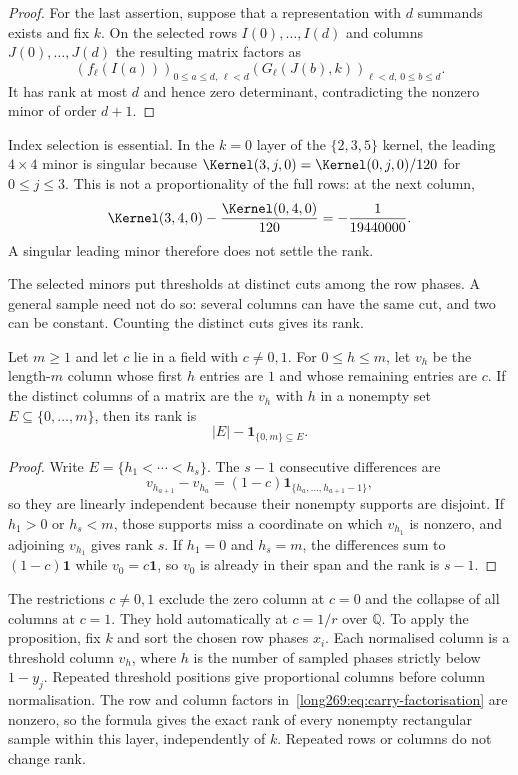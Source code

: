 \begin{proof}
For the last assertion, suppose that a representation with $d$ summands
exists and fix $k$.  On the selected rows $I(0),\ldots,I(d)$ and columns
$J(0),\ldots,J(d)$ the resulting matrix factors as
\[
 (f_\ell(I(a)))_{0\le a\le d,\,\ell<d}
 (G_\ell(J(b),k))_{\ell<d,\,0\le b\le d}.
\]
It has rank at most $d$ and hence zero determinant, contradicting the
nonzero minor of order $d+1$.
\end{proof}


Index selection is essential.  In the $k=0$ layer of the $\{2,3,5\}$
kernel, the leading $4\times4$ minor is singular because
$\Kernel(3,j,0)=\Kernel(0,j,0)/120$ for $0\le j\le3$.
This is not a proportionality of the full rows: at the next column,
\[
 \Kernel(3,4,0)-\frac{\Kernel(0,4,0)}{120}=-\frac1{19440000}.
\]
A singular leading minor therefore does not settle the rank.

The selected minors put thresholds at distinct cuts among the row phases. A general sample
need not do so: several columns can have the same cut, and two can be
constant. Counting the distinct cuts gives its rank.

\begin{proposition}\label{long269:res:finite-cut-rank}
Let $m\ge1$ and let $c$ lie in a field with $c\ne0,1$.  For $0\le h\le m$,
let $v_h$ be the length-$m$ column whose first $h$ entries are $1$ and whose
remaining entries are $c$.  If the distinct columns of a matrix are the
$v_h$ with $h$ in a nonempty set $E\subseteq\{0,\ldots,m\}$, then its rank is
\[
 |E|-\mathbf 1_{\{0,m\}\subseteq E}.
\]
\end{proposition}

\begin{proof}
Write $E=\{h_1<\cdots<h_s\}$.  The $s-1$ consecutive differences are
\[
 v_{h_{a+1}}-v_{h_a}
   =(1-c)\mathbf 1_{\{h_a,\ldots,h_{a+1}-1\}},
\]
so they are linearly independent because their nonempty supports are
disjoint.  If $h_1>0$ or $h_s<m$, those supports miss a coordinate on which
$v_{h_1}$ is nonzero, and adjoining $v_{h_1}$ gives rank $s$.  If
$h_1=0$ and $h_s=m$, the differences sum to $(1-c)\mathbf 1$ while
$v_0=c\mathbf 1$, so $v_0$ is already in their span and the rank is $s-1$.
\end{proof}

The restrictions $c\ne0,1$ exclude the zero column at $c=0$ and the
collapse of all columns at $c=1$.  They hold automatically at $c=1/r$ over
$\mathbb Q$.
To apply the proposition, fix $k$ and sort the chosen row phases $x_i$.
Each normalised column is a threshold column $v_h$, where $h$ is the
number of sampled phases strictly below $1-y_j$.  Repeated threshold
positions give proportional columns before column normalisation.
The row and column factors in~\eqref{long269:eq:carry-factorisation} are
nonzero, so the formula gives the exact rank of every nonempty rectangular
sample within this layer, independently of $k$.  Repeated rows or columns
do not change rank.


